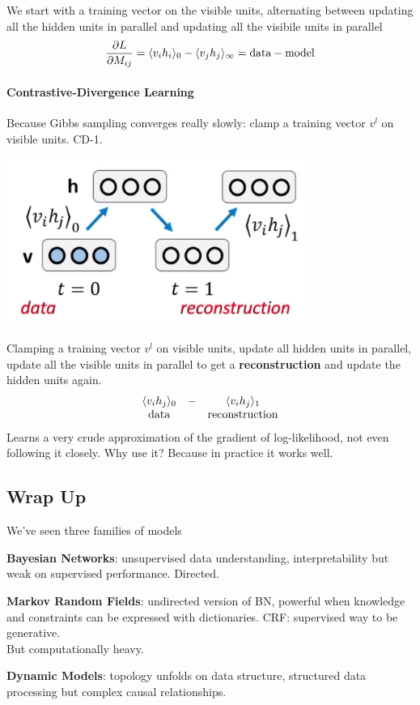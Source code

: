 \documentclass[10pt]{report}
\begin{document}
We start with a training vector on the visible units, alternating between updating all the hidden units in parallel and updating all the visibile units in parallel
$$\frac{\partial L}{\partial M_{ij}} = \langle v_ih_i\rangle_0 - \langle v_jh_j\rangle_\infty = \hbox{data} - \hbox{model}$$
\paragraph{Contrastive-Divergence Learning} Because Gibbs sampling converges really slowly: clamp a training vector $v^l$ on visible units. CD-1.
\begin{center}
	\includegraphics[scale=0.5]{49.png}
\end{center}
Clamping a training vector $v^l$ on visible units, update all hidden units in parallel, update all the visible units in parallel to get a \textbf{reconstruction} and update the hidden units again.
$$\begin{array}{c c c}
\langle v_ih_j\rangle_0&-&\langle v_ih_j\rangle_1\\
\hbox{data}& &\hbox{reconstruction}
\end{array}$$
Learns a very crude approximation of the gradient of log-likelihood, not even following it closely. Why use it? Because in practice it works well.

\subsection{Wrap Up}
We've seen three families of models\begin{list}{}{}
	\item \textbf{Bayesian Networks}: unsupervised data understanding, interpretability but weak on supervised performance. Directed.
	\item \textbf{Markov Random Fields}: undirected version of BN, powerful when knowledge and constraints can be expressed with dictionaries. CRF: supervised way to be generative.\\
	But computationally heavy.
	\item \textbf{Dynamic Models}: topology unfolds on data structure, structured data processing but complex causal relationships.
\end{list}
\end{document}
